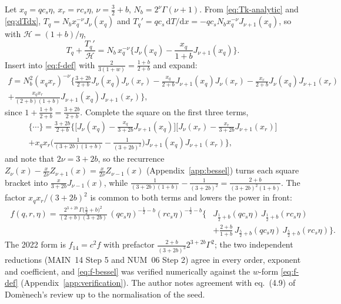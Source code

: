 \documentclass[11pt,a4paper]{article}
\newcommand{\cH}{\mathcal{H}}
\newcommand{\dd}{\mathrm{d}}
\newcommand{\note}[1]{\textsf{#1}}
\theoremstyle{remark}
\begin{document}
Let $x_q = qc_s\eta$, $x_r = rc_s\eta$, $\nu = \tfrac32+b$, $N_b = 2^\nu\Gamma(\nu+1)$. From \eqref{eq:Tk-analytic} and \eqref{eq:dTdx}, $T_q = N_bx_q^{-\nu}J_\nu(x_q)$ and $T_q' = qc_s\,\dd T/\dd x = -qc_sN_bx_q^{-\nu}J_{\nu+1}(x_q)$, so with $\cH = (1+b)/\eta$,
\begin{equation}
T_q + \frac{T_q'}{\cH} = N_b\,x_q^{-\nu}\Big\{J_\nu(x_q) - \frac{x_q}{1+b}J_{\nu+1}(x_q)\Big\}.
\end{equation}
Insert into \eqref{eq:f-def} with $\tfrac{2}{3(1+w)} = \tfrac{1+b}{2+b}$ and expand:
\begin{multline}
f = N_b^2(x_qx_r)^{-\nu}\Big\{\frac{3+2b}{2+b}J_\nu(x_q)J_\nu(x_r)
 - \frac{x_q}{2+b}J_{\nu+1}(x_q)J_\nu(x_r) - \frac{x_r}{2+b}J_\nu(x_q)J_{\nu+1}(x_r)\\
 + \frac{x_qx_r}{(2+b)(1+b)}J_{\nu+1}(x_q)J_{\nu+1}(x_r)\Big\},
\label{eq:f-four-terms}
\end{multline}
since $1 + \tfrac{1+b}{2+b} = \tfrac{3+2b}{2+b}$. Complete the square on the first three terms,
\begin{multline}
\{\cdots\} = \frac{3+2b}{2+b}\Big\{\Big[J_\nu(x_q) - \frac{x_q}{3+2b}J_{\nu+1}(x_q)\Big]\Big[J_\nu(x_r) - \frac{x_r}{3+2b}J_{\nu+1}(x_r)\Big]\\
 + x_qx_r\Big(\frac{1}{(3+2b)(1+b)} - \frac{1}{(3+2b)^2}\Big)J_{\nu+1}(x_q)J_{\nu+1}(x_r)\Big\},
\end{multline}
and note that $2\nu = 3+2b$, so the recurrence $Z_\nu(x) - \tfrac{x}{2\nu}Z_{\nu+1}(x) = \tfrac{x}{2\nu}Z_{\nu-1}(x)$ (Appendix~\ref{app:bessel}) turns each square bracket into $\tfrac{x}{3+2b}J_{\nu-1}(x)$, while $\tfrac{1}{(3+2b)(1+b)} - \tfrac{1}{(3+2b)^2} = \tfrac{2+b}{(3+2b)^2(1+b)}$. The factor $x_qx_r/(3+2b)^2$ is common to both terms and lowers the power in front:
\begin{equation}
\boxed{\;
\begin{aligned}
f(q,r,\eta) = \frac{2^{3+2b}\,\Gamma\!\big(\tfrac52+b\big)^2}{(2+b)(3+2b)}\,(qc_s\eta)^{-\frac12-b}(rc_s\eta)^{-\frac12-b}
\Big\{&J_{\frac12+b}(qc_s\eta)\,J_{\frac12+b}(rc_s\eta)\\
&+ \frac{2+b}{1+b}\,J_{\frac52+b}(qc_s\eta)\,J_{\frac52+b}(rc_s\eta)\Big\}.
\end{aligned}\;}
\label{eq:f-bessel}
\end{equation}
The 2022 form is $f_{14} = c^2f$ with prefactor $\tfrac{2+b}{(3+2b)^3}2^{3+2b}\Gamma^2$; the two independent reductions (\note{MAIN}~14 Step 5 and \note{NUM}~06 Step 2) agree in every order, exponent and coefficient, and \eqref{eq:f-bessel} was verified numerically against the $w$-form \eqref{eq:f-def} (Appendix~\ref{app:verification}). The author notes agreement with eq.~(4.9) of Dom\`enech's review up to the normalisation of the seed.
\end{document}
